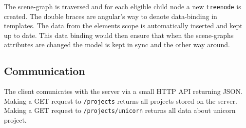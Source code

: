 The scene-graph is traversed and for each eligible child node a new
\texttt{treenode} is created. The double braces are angular's way
to denote data-binding in templates. The data from the elements scope is
automatically inserted and kept up to date. This data binding would then
ensure that when the scene-graphs attributes are changed the model is
kept in sync and the other way around.

\subsection{Communication}
\label{interaction}

The client comunicates with the server via a small HTTP API returning JSON.
Making a GET request to \texttt{/projects} returns all projects stored on the server.
Making a GET request to \texttt{/projects/unicorn} returns all data about unicorn project.
